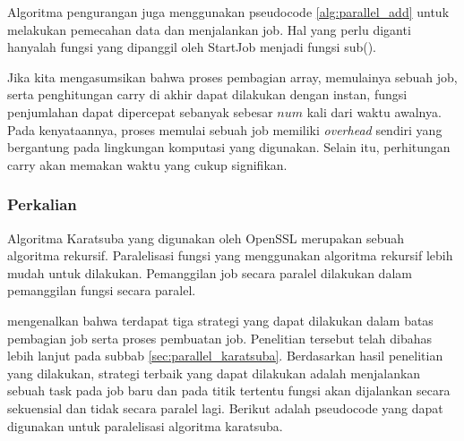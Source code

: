       Algoritma pengurangan juga menggunakan pseudocode \ref{alg:parallel_add} untuk melakukan pemecahan data dan menjalankan job. Hal yang perlu diganti hanyalah fungsi yang dipanggil oleh StartJob menjadi fungsi sub().

      Jika kita mengasumsikan bahwa proses pembagian array, memulainya sebuah job, serta penghitungan carry di akhir dapat dilakukan dengan instan, fungsi penjumlahan dapat dipercepat sebanyak sebesar $num$ kali dari waktu awalnya. Pada kenyataannya, proses memulai sebuah job memiliki \textit{overhead} sendiri yang bergantung pada lingkungan komputasi yang digunakan. Selain itu, perhitungan carry akan memakan waktu yang cukup signifikan.


    \subsubsection{Perkalian} \label{sec:mul_parallel}

      Algoritma Karatsuba yang digunakan oleh OpenSSL merupakan sebuah algoritma rekursif. Paralelisasi fungsi yang menggunakan algoritma rekursif lebih mudah untuk dilakukan. Pemanggilan job secara paralel dilakukan dalam pemanggilan fungsi secara paralel.

      \citet{parallel_karatsuba_analysis} mengenalkan bahwa terdapat tiga strategi yang dapat dilakukan dalam batas pembagian job serta proses pembuatan job. Penelitian tersebut telah dibahas lebih lanjut  pada subbab \ref{sec:parallel_karatsuba}. Berdasarkan hasil penelitian yang dilakukan, strategi terbaik yang dapat dilakukan adalah menjalankan sebuah task pada job baru dan pada titik tertentu fungsi akan dijalankan secara sekuensial dan tidak secara paralel lagi. Berikut adalah pseudocode yang dapat digunakan untuk paralelisasi algoritma karatsuba.

